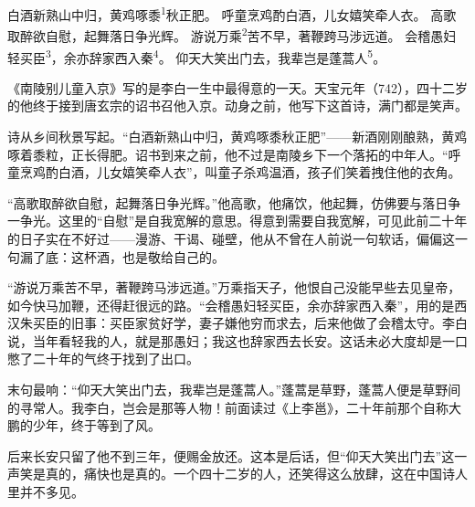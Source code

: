 
\begin{poem}
白酒新熟山中归，黄鸡啄黍\textsuperscript{1}秋正肥。
呼童烹鸡酌白酒，儿女嬉笑牵人衣。
高歌取醉欲自慰，起舞落日争光辉。
游说万乘\textsuperscript{2}苦不早，著鞭跨马涉远道。
会稽愚妇轻买臣\textsuperscript{3}，余亦辞家西入秦\textsuperscript{4}。
仰天大笑出门去，我辈岂是蓬蒿人\textsuperscript{5}。
\end{poem}

\begin{annotations}
\end{annotations}

\begin{appreciation}
《南陵别儿童入京》写的是李白一生中最得意的一天。天宝元年（742），四十二岁的他终于接到唐玄宗的诏书召他入京。动身之前，他写下这首诗，满门都是笑声。

诗从乡间秋景写起。“白酒新熟山中归，黄鸡啄黍秋正肥”——新酒刚刚酿熟，黄鸡啄着黍粒，正长得肥。诏书到来之前，他不过是南陵乡下一个落拓的中年人。“呼童烹鸡酌白酒，儿女嬉笑牵人衣”，叫童子杀鸡温酒，孩子们笑着拽住他的衣角。

“高歌取醉欲自慰，起舞落日争光辉。”他高歌，他痛饮，他起舞，仿佛要与落日争一争光。这里的“自慰”是自我宽解的意思。得意到需要自我宽解，可见此前二十年的日子实在不好过——漫游、干谒、碰壁，他从不曾在人前说一句软话，偏偏这一句漏了底：这杯酒，也是敬给自己的。

“游说万乘苦不早，著鞭跨马涉远道。”万乘指天子，他恨自己没能早些去见皇帝，如今快马加鞭，还得赶很远的路。“会稽愚妇轻买臣，余亦辞家西入秦”，用的是西汉朱买臣的旧事：买臣家贫好学，妻子嫌他穷而求去，后来他做了会稽太守。李白说，当年看轻我的人，就是那愚妇；我这也辞家西去长安。这话未必大度却是一口憋了二十年的气终于找到了出口。

末句最响：“仰天大笑出门去，我辈岂是蓬蒿人。”蓬蒿是草野，蓬蒿人便是草野间的寻常人。我李白，岂会是那等人物！前面读过《上李邕》，二十年前那个自称大鹏的少年，终于等到了风。

后来长安只留了他不到三年，便赐金放还。这本是后话，但“仰天大笑出门去”这一声笑是真的，痛快也是真的。一个四十二岁的人，还笑得这么放肆，这在中国诗人里并不多见。
\end{appreciation}
